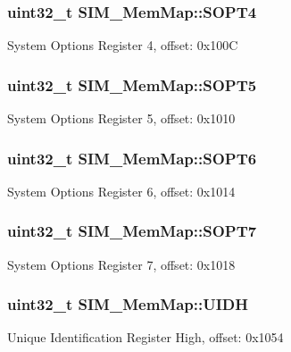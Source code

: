\subsubsection[{S\+O\+P\+T4}]{\setlength{\rightskip}{0pt plus 5cm}uint32\+\_\+t S\+I\+M\+\_\+\+Mem\+Map\+::\+S\+O\+P\+T4}\label{struct_s_i_m___mem_map_adf28cda65cea7072379ec6064d0d93cc}
System Options Register 4, offset\+: 0x100\+C \hypertarget{struct_s_i_m___mem_map_a19e2ddf391b1d9c03240be8267fdf781}{}
\subsubsection[{S\+O\+P\+T5}]{\setlength{\rightskip}{0pt plus 5cm}uint32\+\_\+t S\+I\+M\+\_\+\+Mem\+Map\+::\+S\+O\+P\+T5}\label{struct_s_i_m___mem_map_a19e2ddf391b1d9c03240be8267fdf781}
System Options Register 5, offset\+: 0x1010 \hypertarget{struct_s_i_m___mem_map_aa8030cdf04fef86a5fd4b10f7686e5fa}{}
\subsubsection[{S\+O\+P\+T6}]{\setlength{\rightskip}{0pt plus 5cm}uint32\+\_\+t S\+I\+M\+\_\+\+Mem\+Map\+::\+S\+O\+P\+T6}\label{struct_s_i_m___mem_map_aa8030cdf04fef86a5fd4b10f7686e5fa}
System Options Register 6, offset\+: 0x1014 \hypertarget{struct_s_i_m___mem_map_a04a22056fd7d08179705d29cda1b9e2a}{}
\subsubsection[{S\+O\+P\+T7}]{\setlength{\rightskip}{0pt plus 5cm}uint32\+\_\+t S\+I\+M\+\_\+\+Mem\+Map\+::\+S\+O\+P\+T7}\label{struct_s_i_m___mem_map_a04a22056fd7d08179705d29cda1b9e2a}
System Options Register 7, offset\+: 0x1018 \hypertarget{struct_s_i_m___mem_map_a28fe54037c53da17fa24c0b361dbdfa3}{}
\subsubsection[{U\+I\+D\+H}]{\setlength{\rightskip}{0pt plus 5cm}uint32\+\_\+t S\+I\+M\+\_\+\+Mem\+Map\+::\+U\+I\+D\+H}\label{struct_s_i_m___mem_map_a28fe54037c53da17fa24c0b361dbdfa3}
Unique Identification Register High, offset\+: 0x1054 \hypertarget{struct_s_i_m___mem_map_ac23a694afa8d84e55fc43ff0c0ec1b29}{}
